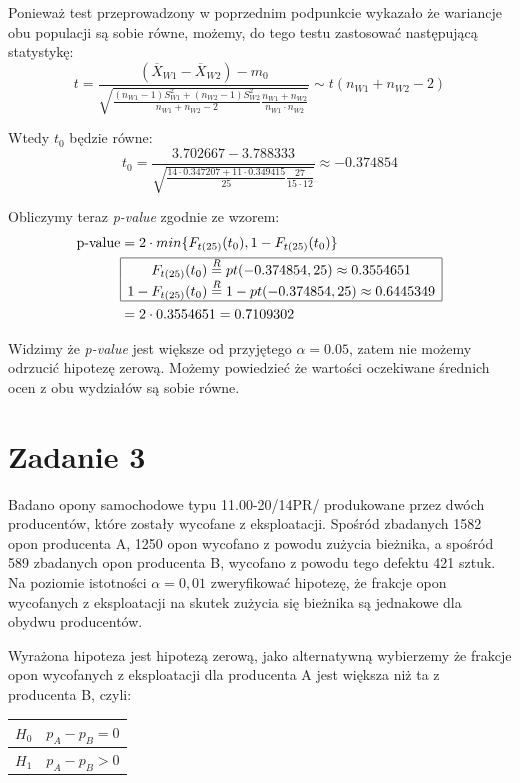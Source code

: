 \documentclass{article}
\begin{document}
Ponieważ test przeprowadzony w poprzednim podpunkcie wykazało że wariancje obu populacji są sobie równe, możemy, do tego testu zastosować następującą statystykę:
\[ t = \frac{(\overline{X}_{W1} - \overline{X}_{W2}) - m_0}{\sqrt{ \frac{(n_{W1} - 1)S_{W1}^2 + (n_{W2} - 1)S_{W2}^2}{n_{W1} + n_{W2} - 2} \frac{n_{W1} + n_{W2}}{n_{W1} \cdot n_{W2}} }} \sim t(n_{W1} + n_{W2} - 2) \]

Wtedy $t_0$ będzie równe:
\[ t_0 = \frac{3.702667 - 3.788333}{\sqrt{ \frac{14 \cdot 0.347207 + 11 \cdot 0.349415}{25} \frac{27}{15\cdot 12} } } \approx -0.374854 \]

Obliczymy teraz \textit{p-value} zgodnie ze wzorem:
\begin{align*}
\text{p-value} & = 2 \cdot min\{ F_{t(25)}(t_0), 1 - F_{t(25)}(t_0) \} \\
& \begin{array}{|c|}
\hline
F_{t(25)}(t_0)  \overset{R}{=} pt(-0.374854, 25) \approx 0.3554651 \\
1 - F_{t(25)}(t_0) \overset{R}{=} 1 -  pt(-0.374854, 25) \approx  0.6445349\\ \hline
\end{array} \\
& = 2 \cdot 0.3554651 = 0.7109302
\end{align*}

Widzimy że \textit{p-value} jest większe od przyjętego $\alpha = 0.05$, zatem nie możemy odrzucić hipotezę zerową. Możemy powiedzieć że wartości oczekiwane średnich ocen z obu wydziałów są sobie równe.

\newpage
\section{Zadanie 3}
Badano opony samochodowe typu 11.00-20/14PR/ produkowane przez dwóch producentów, które zostały wycofane z eksploatacji. Spośród zbadanych 1582 opon producenta A, 1250 opon wycofano z powodu zużycia bieżnika, a spośród 589 zbadanych opon producenta B, wycofano z powodu tego defektu 421 sztuk. Na poziomie istotności $\alpha=0,01$ zweryfikować hipotezę, że frakcje opon wycofanych z eksploatacji na skutek zużycia się bieżnika są jednakowe dla obydwu producentów. \\ \par

Wyrażona hipoteza jest hipotezą zerową, jako alternatywną wybierzemy że frakcje opon wycofanych z eksploatacji dla producenta A jest większa niż ta z producenta B, czyli:
\begin{center} \begin{tabular}{|c|c|} \hline
$H_0$ & $p_A - p_B = 0$ \\ \hline
$H_1$ & $p_A - p_B > 0$ \\ \hline
\end{tabular} \end{center}
\end{document}
